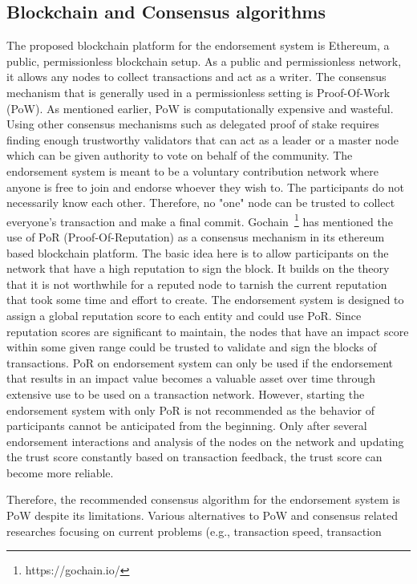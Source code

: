 \subsection{Blockchain and Consensus algorithms}\label{subsec:bcConsensus}
The proposed blockchain platform for the endorsement system is Ethereum, a
public, permissionless blockchain setup. As a public and permissionless
network, it allows any nodes to collect transactions and act as a writer. The
consensus mechanism that is generally used in a permissionless setting is
Proof-Of-Work (PoW). As mentioned earlier, PoW is computationally expensive and
wasteful. Using other consensus mechanisms such as delegated proof of stake
requires finding enough trustworthy validators that can act as a leader or a
master node which can be given authority to vote on behalf of the community.
The endorsement system is meant to be a voluntary contribution network where
anyone is free to join and endorse whoever they wish to. The participants do
not necessarily know each other. Therefore, no "one" node can be trusted to
collect everyone's transaction and make a final commit.
Gochain~\footnote{https://gochain.io/} has mentioned the use of PoR
(Proof-Of-Reputation) as a consensus mechanism in its ethereum based blockchain
platform. The basic idea here is to allow participants on the network that have
a high reputation to sign the block. It builds on the theory that it is not
worthwhile for a reputed node to tarnish the current reputation that took some
time and effort to create. The endorsement system is designed to assign a
global reputation score to each entity and could use PoR. Since reputation
scores are significant to maintain, the nodes that have an impact score within
some given range could be trusted to validate and sign the blocks of
transactions. PoR on endorsement system can only be used if the endorsement
that results in an impact value becomes a valuable asset over time through
extensive use to be used on a transaction network. However, starting the
endorsement system with only PoR is not recommended as the behavior of
participants cannot be anticipated from the beginning. Only after several
endorsement interactions and analysis of the nodes on the network and updating
the trust score constantly based on transaction feedback, the trust score can
become more reliable. \par
Therefore, the recommended consensus algorithm for the endorsement system is
PoW despite its limitations. Various alternatives to PoW and consensus related
researches focusing on current problems (e.g.,  transaction speed, transaction
